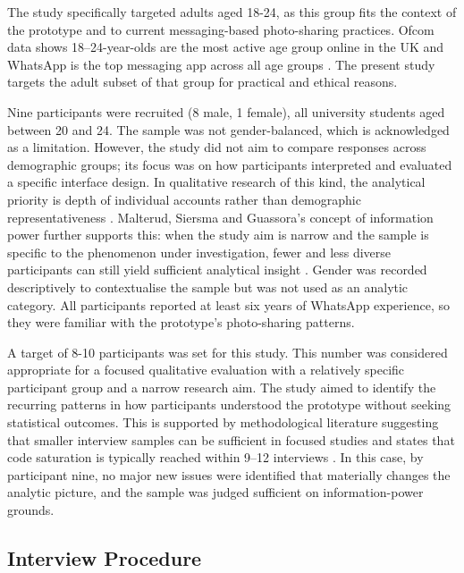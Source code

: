 The study specifically targeted adults aged 18-24, as this group fits the context of the prototype and to current messaging-based photo-sharing practices. Ofcom data shows 18–24-year-olds are the most active age group online in the UK and WhatsApp is the top messaging app across all age groups \cite{OfcomOnlineNation2025,OfcomAdultsMediaUse2025}. The present study targets the adult subset of that group for practical and ethical reasons. 

Nine participants were recruited (8 male, 1 female), all university students aged between 20 and 24. The sample was not gender-balanced, which is acknowledged as a limitation. However, the study did not aim to compare responses across demographic groups; its focus was on how participants interpreted and evaluated a specific interface design. In qualitative research of this kind, the analytical priority is depth of individual accounts rather than demographic representativeness \cite{braun2019, malterud_2016}. Malterud, Siersma and Guassora's concept of information power further supports this: when the study aim is narrow and the sample is specific to the phenomenon under investigation, fewer and less diverse participants can still yield sufficient analytical insight \cite{malterud_2016}. Gender was recorded descriptively to contextualise the sample but was not used as an analytic category. All participants reported at least six years of WhatsApp experience, so they were familiar with the prototype's photo-sharing patterns.

A target of 8-10 participants was set for this study. This number was considered appropriate for a focused qualitative evaluation with a relatively specific participant group and a narrow research aim. The study aimed to identify the recurring patterns in how participants understood the prototype without seeking statistical outcomes. This is supported by methodological literature suggesting that smaller interview samples can be sufficient in focused studies and states that code saturation is typically reached within 9–12 interviews \cite{Hennink_2017,Guest_Bunce_Johnson_2006}. In this case, by participant nine, no major new issues were identified that materially changes the analytic picture, and the sample was judged sufficient on information-power grounds.


\subsection{Interview Procedure}

